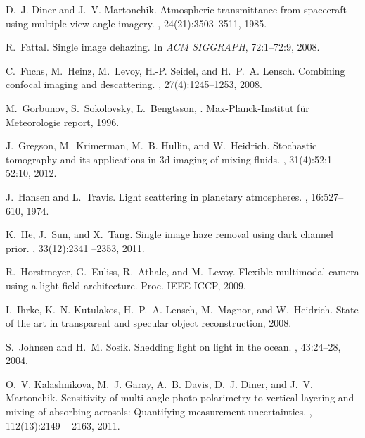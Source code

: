 \documentclass[10pt,twocolumn,letterpaper]{article}
\begin{document}
{\begin{thebibliography}{10}

D.~J. Diner and J.~V. Martonchik.
\newblock Atmospheric transmittance from spacecraft using multiple view angle
  imagery.
, 24(21):3503--3511, 1985.

R.~Fattal.
\newblock Single image dehazing.
\newblock In {\em ACM SIGGRAPH}, 72:1--72:9, 2008.

C.~Fuchs, M.~Heinz, M.~Levoy, H.-P. Seidel, and H.~P.~A. Lensch.
\newblock Combining confocal imaging and descattering.
, 27(4):1245--1253, 2008.

M.~Gorbunov, S.~Sokolovsky, L.~Bengtsson, %
.
\newblock Max-Planck-Institut f{\"u}r Meteorologie report, 1996.

J.~Gregson, M.~Krimerman, M.~B. Hullin, and W.~Heidrich.
\newblock Stochastic tomography and its applications in 3d imaging of mixing
  fluids.
, 31(4):52:1--52:10, 2012.

J.~Hansen and L.~Travis.
\newblock Light scattering in planetary atmospheres.
, 16:527--610, 1974.

K.~He, J.~Sun, and X.~Tang.
\newblock Single image haze removal using dark channel prior.
, 33(12):2341 --2353, 2011.

R.~Horstmeyer, G.~Euliss, R.~Athale, and M.~Levoy.
\newblock Flexible multimodal camera using a light field architecture.
\newblock Proc. IEEE ICCP, 2009.

I.~Ihrke, K.~N. Kutulakos, H.~P.~A. Lensch, M.~Magnor, and W.~Heidrich.
\newblock State of the art in transparent and specular object reconstruction,
  2008.

S.~Johnsen and H.~M. Sosik.
\newblock Shedding light on light in the ocean.
, 43:24--28, 2004.

O.~V. Kalashnikova, M.~J. Garay, A.~B. Davis, D.~J. Diner, and J.~V.
  Martonchik.
\newblock Sensitivity of multi-angle photo-polarimetry to vertical layering and
  mixing of absorbing aerosols: Quantifying measurement uncertainties.
,
  112(13):2149 -- 2163, 2011.


\end{thebibliography}}
\end{document}

